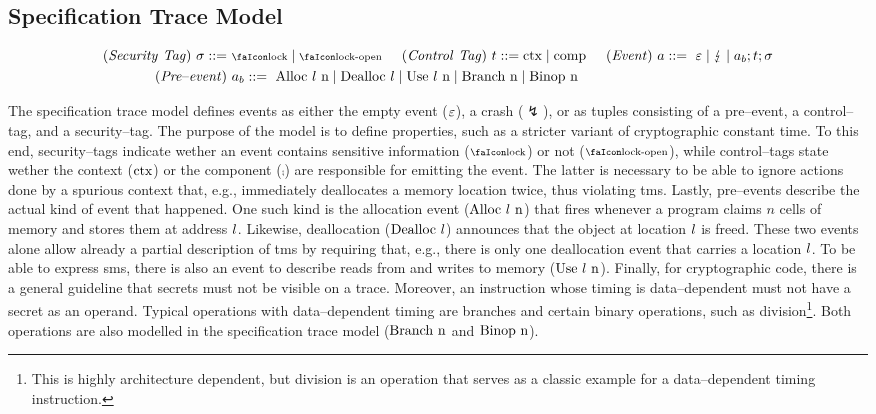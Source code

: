 \documentclass[utf8,acmsmall,review,screen,dvipsnames]{acmart}
\begin{document}
\subsection{Specification Trace Model}\label{subsec:propdefs}

\begin{gather*}
  \begin{aligned}
  \mi{(Security\ Tag)}~\sigma\bnfdef&\ \lock \mid \unlock\hspace{0.5cm}
  \mi{(Control\ Tag)}~\sandboxtag\bnfdef \ctx\mid\comp\hspace{0.5cm}
  \mi{(Event)}~\event\bnfdef\ \emptyevent \mid \lightning \mid \event[_{b}];\sandboxtag;\sigma \\
  \mi{(Pre\text{--}event)}&~\event[_{b}]\bnfdef\ \ev{Alloc\ \loc\ n} \mid \ev{Dealloc\ \loc} \mid \ev{Use\ \loc\ n} \mid \ev{Branch\ n} \mid \ev{Binop\ n} \\
  \end{aligned}
\end{gather*}

The specification trace model defines events as either the empty event ($\varepsilon$), a crash ($\lightning$), or as tuples consisting of a pre--event, a control--tag, and a security--tag.
The purpose of the model is to define properties, such as a stricter variant of cryptographic constant time.
To this end, security--tags indicate wether an event contains sensitive information ($\lock$) or not ($\unlock$), while control--tags state wether the context ($\text{ctx}$) or the component ($\comp$) are responsible for emitting the event.
The latter is necessary to be able to ignore actions done by a spurious context that, e.g., immediately deallocates a memory location twice, thus violating \gls{tms}.
Lastly, pre--events describe the actual kind of event that happened.
One such kind is the allocation event ($\ev{Alloc\ \loc\ n}$) that fires whenever a program claims $n$ cells of memory and stores them at address $l$.
Likewise, deallocation ($\text{Dealloc\ \ensuremath l}$) announces that the object at location $l$ is freed.
These two events alone allow already a partial description of \gls{tms} by requiring that, e.g., there is only one deallocation event that carries a location $l$.
To be able to express \gls{sms}, there is also an event to describe reads from and writes to memory ($\text{Use\ \ensuremath l\ n}$).
Finally, for cryptographic code, there is a general guideline that secrets must not be visible on a trace.
Moreover, an instruction whose timing is data--dependent must not have a secret as an operand.
Typical operations with data--dependent timing are branches and certain binary operations, such as division\footnote{This is highly architecture dependent, but division is an operation that serves as a classic example for a data--dependent timing instruction.}.
Both operations are also modelled in the specification trace model ($\ev{Branch\ n}$ and $\text{Binop\ n}$).
\end{document}
